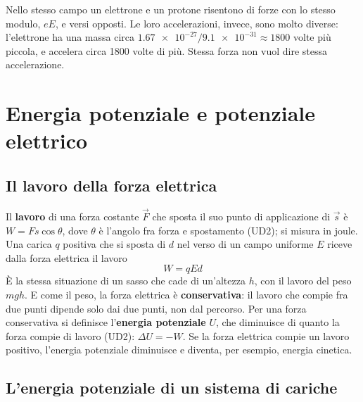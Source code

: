\begin{attenzione}
Nello stesso campo un elettrone e un protone risentono di forze con lo stesso modulo, $eE$, e versi opposti. Le loro accelerazioni, invece, sono molto diverse: l'elettrone ha una massa circa $\num{1,67e-27}/\num{9,1e-31} \approx 1800$ volte più piccola, e accelera circa 1800 volte di più. Stessa forza non vuol dire stessa accelerazione.
\end{attenzione}

\section{Energia potenziale e potenziale elettrico}
\label{sec:ud6-potenziale}

\subsection{Il lavoro della forza elettrica}

Il \textbf{lavoro} di una forza costante $\vec F$ che sposta il suo punto di applicazione di $\vec s$ è $W = F s \cos\theta$, dove $\theta$ è l'angolo fra forza e spostamento (UD2); si misura in joule. Una carica $q$ positiva che si sposta di $d$ nel verso di un campo uniforme $E$ riceve dalla forza elettrica il lavoro
\[
  W = qEd
\]
È la stessa situazione di un sasso che cade di un'altezza $h$, con il lavoro del peso $mgh$. E come il peso, la forza elettrica è \textbf{conservativa}: il lavoro che compie fra due punti dipende solo dai due punti, non dal percorso. Per una forza conservativa si definisce l'\textbf{energia potenziale} $U$, che diminuisce di quanto la forza compie di lavoro (UD2): $\Delta U = -W$. Se la forza elettrica compie un lavoro positivo, l'energia potenziale diminuisce e diventa, per esempio, energia cinetica.

\subsection{L'energia potenziale di un sistema di cariche}

